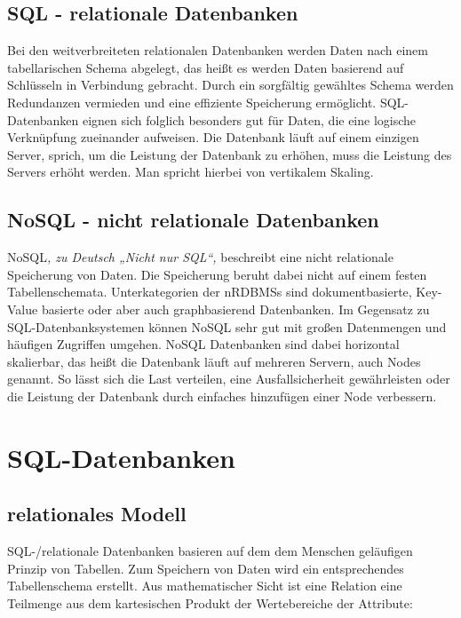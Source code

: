 \documentclass[12pt, a4paper, twoside]{article}
\begin{document}
	\subsection{SQL - relationale Datenbanken}
		Bei den weitverbreiteten relationalen Datenbanken werden Daten nach einem tabellarischen Schema abgelegt, das heißt es werden Daten basierend auf Schlüsseln in Verbindung gebracht. Durch ein sorgfältig gewähltes Schema werden Redundanzen vermieden und eine effiziente Speicherung ermöglicht. SQL-Datenbanken eignen sich folglich besonders gut für Daten, die eine logische Verknüpfung zueinander aufweisen. Die Datenbank läuft auf einem einzigen Server, sprich, um die Leistung der Datenbank zu erhöhen, muss die Leistung des Servers erhöht werden. Man spricht hierbei von vertikalem Skaling. 
		\cite{ibm-sql-nosql}\cite{Meier:SQLNoSQLDatenbanken}
	\subsection{NoSQL - nicht relationale Datenbanken}
		NoSQL\textit{, zu Deutsch „Nicht nur SQL“, }beschreibt eine nicht relationale Speicherung von Daten. Die Speicherung beruht dabei nicht auf einem festen Tabellenschemata. Unterkategorien der \aclp{nRDBMS} sind dokumentbasierte, Key-Value basierte oder aber auch graphbasierend Datenbanken. Im Gegensatz zu SQL-Datenbanksystemen können NoSQL sehr gut mit großen Datenmengen und häufigen Zugriffen umgehen. NoSQL Datenbanken sind dabei horizontal skalierbar, das heißt die Datenbank läuft auf mehreren Servern, auch Nodes genannt. So lässt sich die Last verteilen, eine Ausfallsicherheit gewährleisten oder die Leistung der Datenbank durch einfaches hinzufügen einer Node verbessern. 
		\cite{ibm-sql-nosql} \cite{Meier:SQLNoSQLDatenbanken}
		
\section{SQL-Datenbanken}
	\subsection{relationales Modell}
		SQL-/relationale Datenbanken basieren auf dem dem Menschen geläufigen Prinzip von Tabellen. Zum Speichern von Daten wird ein entsprechendes Tabellenschema erstellt. Aus mathematischer Sicht ist eine Relation eine Teilmenge aus dem kartesischen Produkt der Wertebereiche der Attribute:
		
\end{document}
